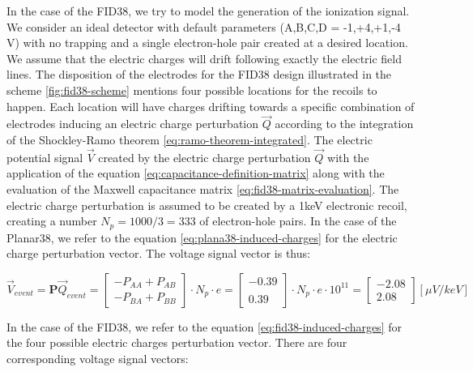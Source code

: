 In the case of the FID38, we try to model the generation of the ionization signal. We consider an ideal detector with default parameters (A,B,C,D = -1,+4,+1,-4 V) with no trapping and a single electron-hole pair created at a desired location. We assume that the electric charges will drift following exactly the electric field lines. The disposition of the electrodes for the FID38 design illustrated in the scheme \ref{fig:fid38-scheme} mentions four possible locations for the recoils to happen. Each location will have charges drifting towards a specific combination of electrodes inducing an electric charge perturbation $\vec{Q}$ according to the integration of the Shockley-Ramo theorem \ref{eq:ramo-theorem-integrated}. The electric potential signal $\vec{V}$ created by the electric charge perturbation $\vec{Q}$ with the application of the equation \ref{eq:capacitance-definition-matrix} along with the evaluation of the Maxwell capacitance matrix \ref{eq:fid38-matrix-evaluation}. The electric charge perturbation is assumed to be created by a 1keV electronic recoil, creating a number $N_p = 1000/3 = 333$ of electron-hole pairs.
In the case of the Planar38, we refer to the equation \ref{eq:plana38-induced-charges} for the electric charge perturbation vector. The voltage signal vector is thus:

\begin{equation}
\label{eq:planar38-sensitivity}
\vec{V}_{event} = \bm{P} \vec{Q}_{event} =
\begin{bmatrix}
- P_{AA} + P_{AB} \\ - P_{BA} + P_{BB}
\end{bmatrix}
\cdot N_p \cdot e
= 
\begin{bmatrix}
-0.39 \\  \\ 0.39
\end{bmatrix}
\cdot N_p \cdot e \cdot 10^{11}
= 
\begin{bmatrix}
-2.08 \\ 2.08 
\end{bmatrix}
[\mu V/keV]
\end{equation}

In the case of the FID38, we refer to the equation \ref{eq:fid38-induced-charges} for the four possible electric charges perturbation vector. There are four corresponding voltage signal vectors:

